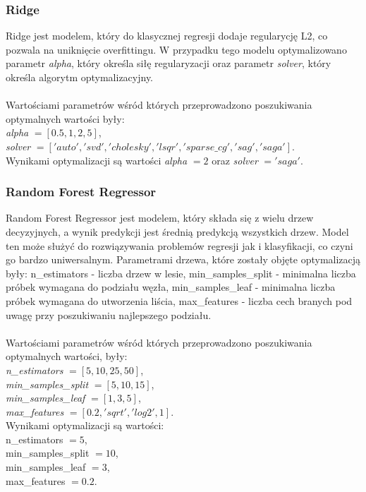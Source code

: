 \documentclass{article}
\begin{document}
\subsubsection{Ridge}
Ridge jest modelem, który  do klasycznej regresji dodaje regularycję L2, co pozwala na uniknięcie overfittingu.
W przypadku tego modelu optymalizowano parametr \textit{alpha}, który określa siłę regularyzacji oraz parametr \textit{solver}, który określa algorytm optymalizacyjny. \\ \\
Wartościami parametrów wśród których przeprowadzono poszukiwania optymalnych wartości były: \\
\textit{alpha} $= [0.5, 1, 2, 5]$, \\
\textit{solver} $= ['auto', 'svd', 'cholesky', 'lsqr', 'sparse\_cg', 'sag', 'saga']$. \\
Wynikami optymalizacji są wartości \textit{alpha} $= 2$ oraz \textit{solver} $= 'saga'$.

\subsubsection{Random Forest Regressor}
Random Forest Regressor jest modelem, który składa się z wielu drzew decyzyjnych, a wynik predykcji jest średnią predykcją wszystkich drzew.
Model ten może służyć do rozwiązywania problemów regresji jak i klasyfikacji, co czyni go bardzo uniwersalnym.
Parametrami drzewa, które zostały objęte optymalizacją były: n\_estimators - liczba drzew w lesie, min\_samples\_split - minimalna liczba próbek wymagana do podziału węzła, 
min\_samples\_leaf - minimalna liczba próbek wymagana do utworzenia liścia, max\_features - liczba cech branych pod uwagę przy poszukiwaniu najlepszego podziału. \\ \\
Wartościami parametrów wśród których przeprowadzono poszukiwania optymalnych wartości, były: \\
\textit{n\_estimators} $= [5, 10, 25, 50]$, \\
\textit{min\_samples\_split} $= [5, 10, 15]$, \\
\textit{min\_samples\_leaf} $= [1, 3, 5]$, \\
\textit{max\_features} $= [0.2, 'sqrt', 'log2', 1]$.\\
Wynikami optymalizacji są wartości: \\
n\_estimators $= 5$, \\
min\_samples\_split $= 10$, \\
min\_samples\_leaf $= 3$, \\ 
max\_features $= 0.2$. \\
\end{document}
